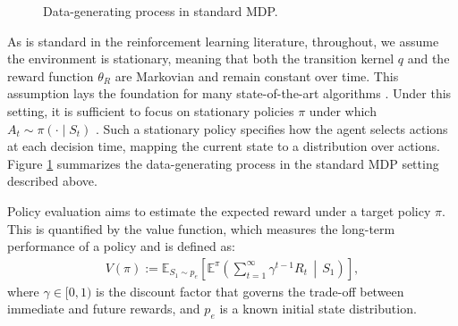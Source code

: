 \documentclass[12pt]{article}
\newcommand{\0}{\boldsymbol{0}}
\begin{document}
\begin{figure}[H]
\centering
{}
\caption{Data-generating process in standard MDP.}
\label{fig:mdp}
\end{figure}



As is standard in the reinforcement learning literature, throughout, we assume the environment is stationary, meaning that both the transition kernel $q$ and the reward function $\theta_R$ are Markovian and remain constant over time. This assumption lays the foundation for many state-of-the-art algorithms \citep{sutton2018}.
Under this setting, it is sufficient to focus on stationary policies $\pi$ under which $A_t \sim \pi(\cdot \mid S_t)$ \citep{puterman2014markov}. Such a stationary policy specifies how the agent selects actions at each decision time, mapping the current state to a distribution over actions. Figure \ref{fig:mdp} summarizes the data-generating process in the standard MDP setting described above.

Policy evaluation aims to estimate the expected reward under a target policy $\pi$. This is quantified by the value function, which measures the long-term performance of a policy and is defined as: \begin{gather} \label{eq:value}
    V(\pi) := \mathbb{E}_{S_1 \sim p_e} \left[ \mathbb{E}^\pi \left(\sum_{t=1}^\infty \gamma^{t-1} R_t \,\middle\vert\, S_1 \right) \right],
\end{gather} 
where $\gamma \in [0, 1)$ is the discount factor that governs the trade-off between immediate and future rewards, and $p_e$ is a known initial state distribution.
\end{document}
